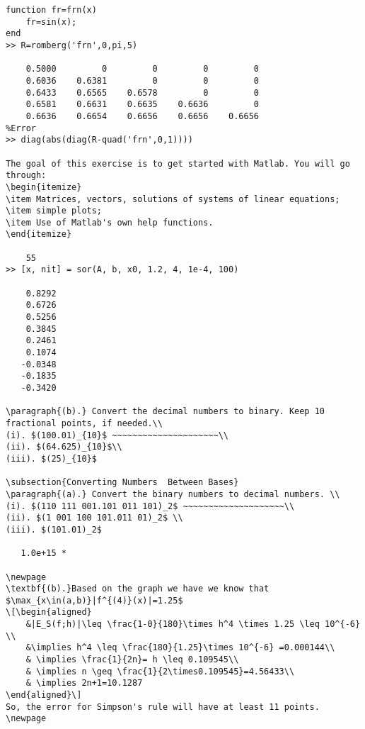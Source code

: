 \begin{verbatim}
function fr=frn(x)
    fr=sin(x);
end
>> R=romberg('frn',0,pi,5)

    0.5000         0         0         0         0
    0.6036    0.6381         0         0         0
    0.6433    0.6565    0.6578         0         0
    0.6581    0.6631    0.6635    0.6636         0
    0.6636    0.6654    0.6656    0.6656    0.6656
%Error
>> diag(abs(diag(R-quad('frn',0,1))))

The goal of this exercise is to get started with Matlab. You will go through:
\begin{itemize}
\item Matrices, vectors, solutions of systems of linear equations;
\item simple plots;
\item Use of Matlab's own help functions.
\end{itemize}

    55
>> [x, nit] = sor(A, b, x0, 1.2, 4, 1e-4, 100)

    0.8292
    0.6726
    0.5256
    0.3845
    0.2461
    0.1074
   -0.0348
   -0.1835
   -0.3420

\paragraph{(b).} Convert the decimal numbers to binary. Keep 10 fractional points, if needed.\\
(i). $(100.01)_{10}$ ~~~~~~~~~~~~~~~~~~~~~\\
(ii). $(64.625)_{10}$\\
(iii). $(25)_{10}$ 

\subsection{Converting Numbers  Between Bases}
\paragraph{(a).} Convert the binary numbers to decimal numbers. \\
(i). $(110 111 001.101 011 101)_2$ ~~~~~~~~~~~~~~~~~~~~\\
(ii). $(1 001 100 101.011 01)_2$ \\
(iii). $(101.01)_2$

   1.0e+15 *

\newpage
\textbf{(b).}Based on the graph we have we know that $\max_{x\in(a,b)}|f^{(4)}(x)|=1.25$
\[\begin{aligned}
    &|E_S(f;h)|\leq \frac{1-0}{180}\times h^4 \times 1.25 \leq 10^{-6} \\
    &\implies h^4 \leq \frac{180}{1.25}\times 10^{-6} =0.000144\\
    & \implies \frac{1}{2n}= h \leq 0.109545\\
    & \implies n \geq \frac{1}{2\times0.109545}=4.56433\\
    & \implies 2n+1=10.1287
\end{aligned}\]
So, the error for Simpson's rule will have at least 11 points.
\newpage

\end{verbatim}
